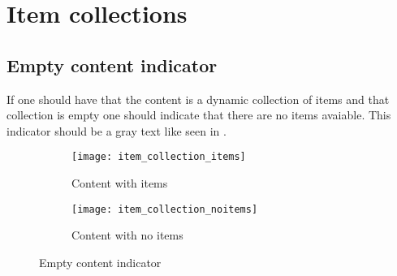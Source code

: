 
\chapter{Item collections}


\section{Empty content indicator}
\label{sec:empty_content_indicator}


If one should have that the content is a dynamic collection of items and that collection is empty one should indicate that there are no items avaiable. This indicator should be a gray text  like seen in .

\begin{figure}
    \centering
    \begin{subfigure}[t]{0.4\textwidth}
        \centering
        \texttt{[image: item\_collection\_items]}
        \caption{Content with items}
        \label{fig:empty_content_items}
    \end{subfigure}
    \hspace{5em} 
    \begin{subfigure}[t]{0.4\textwidth}
        \centering
        \texttt{[image: item\_collection\_noitems]}
        \caption{Content with no items}
        \label{fig:empty_content_noitems}
    \end{subfigure}
    
    \caption{Empty content indicator}
    \label{fig:empty_content}
\end{figure}